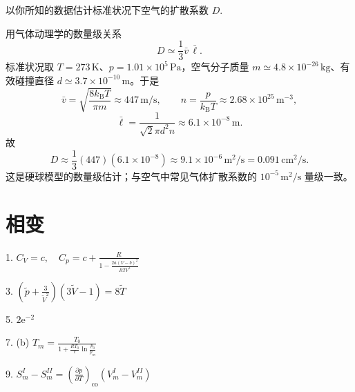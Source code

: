 \begin{exercise}\label{ex:13.14}
以你所知的数据估计标准状况下空气的扩散系数 $D$.
\end{exercise}
\begin{solution}
用气体动理学的数量级关系
\[
D\simeq\frac13\bar v\,\bar\ell.
\]
标准状况取 $T=273\,\mathrm K$、$p=1.01\times10^5\,\mathrm{Pa}$，空气分子质量
$m\simeq4.8\times10^{-26}\,\mathrm{kg}$、有效碰撞直径
$d\simeq3.7\times10^{-10}\,\mathrm m$。于是
\[
\bar v=\sqrt{\frac{8k_{\mathrm B}T}{\pi m}}\approx447\,\mathrm{m/s},\qquad
n=\frac{p}{k_{\mathrm B}T}\approx2.68\times10^{25}\,\mathrm{m^{-3}},
\]
\[
\bar\ell=\frac{1}{\sqrt2\pi d^2n}\approx6.1\times10^{-8}\,\mathrm m.
\]
故
\[
\boxed{D\approx\frac13(447)(6.1\times10^{-8})
\approx9.1\times10^{-6}\,\mathrm{m^2/s}
=0.091\,\mathrm{cm^2/s}}.
\]
这是硬球模型的数量级估计；与空气中常见气体扩散系数的 $10^{-5}\,\mathrm{m^2/s}$ 量级一致。
\end{solution}


\chapter{相变}

\begin{oddanswers}
1. $C_V = c, \quad C_p = c + \frac{R}{1 - \frac{2a(V - b)^2}{RTV^3}}$

3. $\left( \tilde{p} + \frac{3}{\tilde{V}^2} \right) (3\tilde{V} - 1) = 8\tilde{T}$

5. $2\text{e}^{-2}$

7. (b) $T_m = \frac{T_0}{1 + \frac{RT_0}{\ell} \ln \frac{p_0}{p_m}}$

9. $S_m^I - S_m^{II} = \left( \frac{\partial p}{\partial T} \right)_{\text{co}} (V_m^I - V_m^{II})$
\end{oddanswers}

